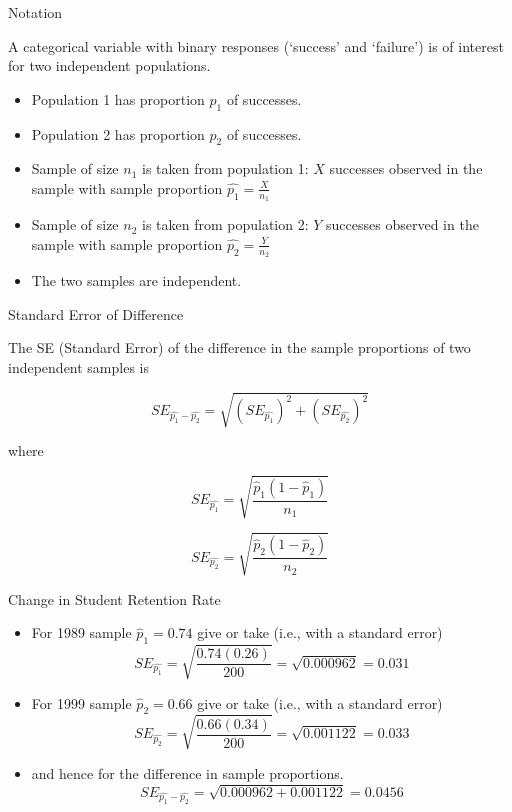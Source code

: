\documentclass[14pt]{beamer}\usepackage[]{graphicx}\usepackage[]{color}
\begin{document}
\begin{frame}[fragile]{Notation}

A categorical variable with binary responses (`success' and `failure') is of  interest for two independent populations.

\begin{itemize}
\item<1-> Population 1 has proportion $p_1$ of successes.  
\item<2-> Population 2 has proportion $p_2$ of successes.
\item<3-> Sample of size $n_1$  is taken from population 1: $X$ successes observed in the sample with sample proportion $\hat{p_1} = \frac{X}{n_1}$
\item<4-> Sample of size $n_2$  is taken from population 2: $Y$ successes observed in the sample with sample proportion $\hat{p_2} = \frac{Y}{n_2}$
\item<5-> The two samples are independent.
\end{itemize}
\end{frame}

\begin{frame}[fragile]{Standard Error of Difference}

The SE (Standard Error) of the difference in the sample proportions of  two independent samples is

$$SE_{\hat{p_1} - \hat{p_2}} = \sqrt{ (SE_{\hat{p_1}})^2 + (SE_{\hat{p_2}})^2} $$

where

{\small{
$$ SE_{\hat{p_1}} = \sqrt{ \frac{ \hat{p}_1 ( 1 - \hat{p}_1)}{n_1}} $$

$$ SE_{\hat{p_2}} = \sqrt{ \frac{ \hat{p}_2 ( 1 - \hat{p}_2)}{n_2}} $$
}}
\end{frame}

\begin{frame}[fragile]{Change in Student Retention Rate}

{\footnotesize{
\begin{itemize}
\item<1-> For 1989 sample $\hat{p}_1 = 0.74$ give or take (i.e., with a standard error)
$$ SE_{\hat{p_1}} = \sqrt{ \frac{ 0.74 ( 0.26)}{200}} = \sqrt{0.000962} = 0.031 $$

\item<2-> For 1999 sample $\hat{p}_2 = 0.66$ give or take (i.e., with a standard error)
$$ SE_{\hat{p_2}} = \sqrt{ \frac{ 0.66 ( 0.34)}{200}} = \sqrt{0.001122} = 0.033 $$

\item<3-> and hence for the difference in sample proportions.
$$SE_{\hat{p_1} - \hat{p_2}} = \sqrt{ 0.000962 + 0.001122} = 0.0456 $$

\end{itemize}
}}
\end{frame}
\end{document}
